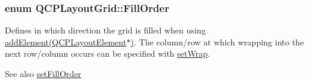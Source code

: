 \subsubsection[{\texorpdfstring{Fill\+Order}{FillOrder}}]{\setlength{\rightskip}{0pt plus 5cm}enum {\bf Q\+C\+P\+Layout\+Grid\+::\+Fill\+Order}}\hypertarget{class_q_c_p_layout_grid_a7d49ee08773de6b2fd246edfed353cca}{}\label{class_q_c_p_layout_grid_a7d49ee08773de6b2fd246edfed353cca}
Defines in which direction the grid is filled when using \hyperlink{class_q_c_p_layout_grid_a4c44025dd25acd27e053cadfd448ad7b}{add\+Element(\+Q\+C\+P\+Layout\+Element$\ast$)}. The column/row at which wrapping into the next row/column occurs can be specified with \hyperlink{class_q_c_p_layout_grid_ab36af18d77e4428386d02970382ee598}{set\+Wrap}.

\begin{DoxySeeAlso}{See also}
\hyperlink{class_q_c_p_layout_grid_affc2f3cfd22f28698c5b29b960d2a391}{set\+Fill\+Order} 
\end{DoxySeeAlso}

